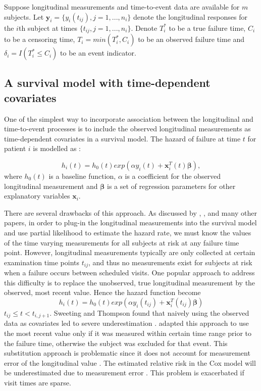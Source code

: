 \documentclass{article}
\numberwithin{equation}{section}
\begin{document}
Suppose longitudinal measurements and time-to-event data are available for $m$ subjects. Let $\bm{y}_i = \{y_i(t_{ij}), j=1,...,n_i\}$ denote the longitudinal responses for the $i$th subject at times $\{t_{ij}, j=1,...,n_i\}$. Denote $T_i^*$ to be a true failure time, $C_i$ to be a censoring time, $T_i=min(T_i^*,C_i)$ to be an observed failure time and $\delta_i=I(T_i^* \le C_i)$ to be an event indicator.

\subsection{A survival model with time-dependent covariates}
One of the simplest way to incorporate association between the longitudinal and time-to-event processes is to include the observed longitudinal measurements as time-dependent covariates in a survival model. The hazard of failure at time $t$ for patient $i$ is modelled as \cite{sweeting2011joint}:

\begin{equation}
 h_i(t)=h_0(t)exp(\alpha y_i(t)+\bm{x}_i^T(t) \bm{\beta}), 
\end{equation}
where $h_0(t)$ is a baseline function, $\alpha$ is a coefficient for the observed longitudinal measurement and $\bm{\beta}$ is a set of regression parameters for other explanatory variables $\bm{x}_i$.

There are several drawbacks of this approach. As discussed by \cite{sweeting2011joint}, \cite{tsiatis2004joint}, \cite{yu2004joint} and many other papers, in order to plug-in the longitudinal measurements into the survival model and use partial likelihood to estimate the hazard rate, we must know the values of the time varying measurements for all subjects at risk at any failure time point. However, longitudinal measurements typically are only collected at certain examination time points $t_{ij}$, and thus no measurements exist for subjects at risk when a failure occurs between scheduled visits. One popular approach to address this difficulty is to replace the unobserved, true longitudinal measurement by the observed,  most recent value. Hence the hazard function become
\begin{equation}
 h_i(t)=h_0(t)exp(\alpha y_i(t_{ij})+\bm{x}_i^T(t_{ij}) \bm{\beta}) 
\end{equation}
$t_{ij}\le t < t_{i,j+1}$.
Sweeting and Thompson found that naively using the observed data as covariates led to severe underestimation \cite{sweeting2011joint}. \cite{gail1981evaluating} adapted this approach to use the most recent value only if it was measured within certain time range prior to the failure time, otherwise the subject was excluded for that event. This substitution approach is problematic since it does not account for measurement error of the longitudinal value \cite{tsiatis1995modeling}. The estimated relative risk in the Cox model will be underestimated due to measurement error \cite{prentice1982covariate}. This problem is exacerbated if visit times are sparse. 
\end{document}
